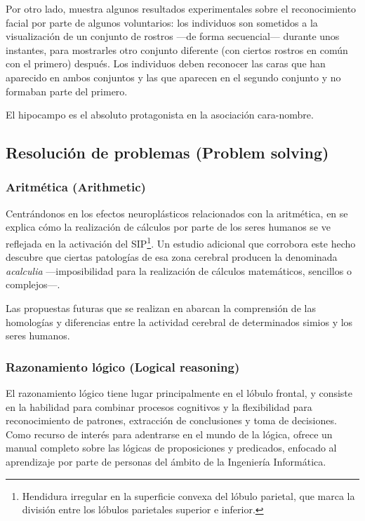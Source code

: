 Por otro lado, \cite{Trinkler2009} muestra algunos resultados experimentales sobre el reconocimiento facial por parte de algunos voluntarios: los individuos son sometidos a la visualización de un conjunto de rostros ---de forma secuencial--- durante unos instantes, para mostrarles otro conjunto diferente (con ciertos rostros en común con el primero) después. Los individuos deben reconocer las caras que han aparecido en ambos conjuntos y las que aparecen en el segundo conjunto y no formaban parte del primero.

El hipocampo es el absoluto protagonista en la asociación cara-nombre.

\subsection{Resolución de problemas (Problem solving)}

\subsubsection{Aritmética (Arithmetic)}

Centrándonos en los efectos neuroplásticos relacionados con la aritmética, en \cite{Dehaene2004} se explica cómo la realización de cálculos por parte de los seres humanos se ve reflejada en la activación del \acf{SIP}\footnote{Hendidura irregular en la superficie convexa del lóbulo parietal, que marca la división entre los lóbulos parietales superior e inferior.}. Un estudio adicional que corrobora este hecho descubre que ciertas patologías de esa zona cerebral producen la denominada {\it acalculia} ---imposibilidad para la realización de cálculos matemáticos, sencillos o complejos---.

Las propuestas futuras que se realizan en \cite{Dehaene2004} abarcan la comprensión de las homologías y diferencias entre la actividad cerebral de determinados simios y los seres humanos.

\subsubsection{Razonamiento lógico (Logical reasoning)}

El razonamiento lógico tiene lugar principalmente en el lóbulo frontal, y consiste en la habilidad para combinar procesos cognitivos y la flexibilidad para reconocimiento de patrones, extracción de conclusiones y toma de decisiones. Como recurso de interés para adentrarse en el mundo de la lógica, \cite{JulianIranzo2004} ofrece un manual completo sobre las lógicas de proposiciones y predicados, enfocado al aprendizaje por parte de personas del ámbito de la Ingeniería Informática.

